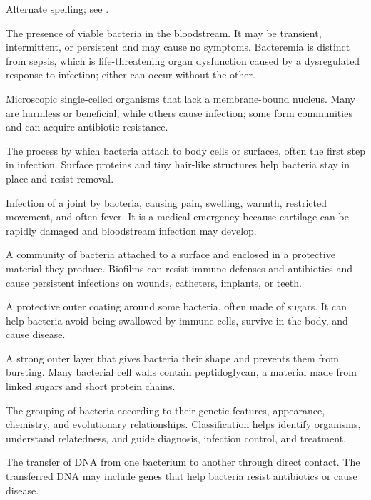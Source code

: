  Alternate spelling; see .

 The presence of viable bacteria in the bloodstream. It may be transient, intermittent, or persistent and may cause no symptoms. Bacteremia is distinct from sepsis, which is life-threatening organ dysfunction caused by a dysregulated response to infection; either can occur without the other.

 Microscopic single-celled organisms that lack a membrane-bound nucleus. Many are harmless or beneficial, while others cause infection; some form communities and can acquire antibiotic resistance.

 The process by which bacteria attach to body cells or surfaces, often the first step in infection. Surface proteins and tiny hair-like structures help bacteria stay in place and resist removal.

 Infection of a joint by bacteria, causing pain, swelling, warmth, restricted movement, and often fever. It is a medical emergency because cartilage can be rapidly damaged and bloodstream infection may develop.

 A community of bacteria attached to a surface and enclosed in a protective material they produce. Biofilms can resist immune defenses and antibiotics and cause persistent infections on wounds, catheters, implants, or teeth.

 A protective outer coating around some bacteria, often made of sugars. It can help bacteria avoid being swallowed by immune cells, survive in the body, and cause disease.

 A strong outer layer that gives bacteria their shape and prevents them from bursting. Many bacterial cell walls contain peptidoglycan, a material made from linked sugars and short protein chains.

 The grouping of bacteria according to their genetic features, appearance, chemistry, and evolutionary relationships. Classification helps identify organisms, understand relatedness, and guide diagnosis, infection control, and treatment.

 The transfer of DNA from one bacterium to another through direct contact. The transferred DNA may include genes that help bacteria resist antibiotics or cause disease.


